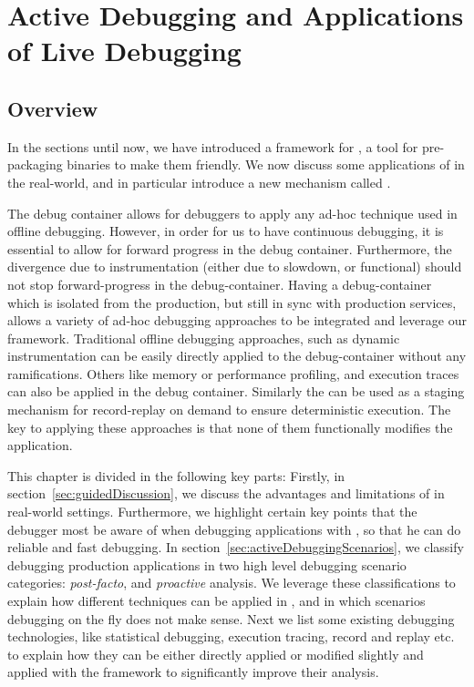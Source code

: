 \chapter{Active Debugging and Applications of Live Debugging}
\label{ch:activedebugging}

\section{Overview}
\label{sec:guided_overview}

In the sections until now, we have introduced a framework for \livedebugging, a tool for pre-packaging binaries to make them \livedebugging friendly. 
We now discuss some applications of \livedebugging in the real-world, and in particular introduce a new mechanism called \activedebugging.


The debug container allows for debuggers to apply any ad-hoc technique used in offline debugging.
However, in order for us to have continuous debugging, it is essential to allow for forward progress in the debug container. 
Furthermore, the divergence due to instrumentation (either due to slowdown, or functional) should not stop forward-progress in the debug-container.
Having a debug-container which is isolated from the production, but still in sync with production services, allows a variety of ad-hoc debugging approaches to be integrated and leverage our framework.
Traditional offline debugging approaches, such as dynamic instrumentation can be easily directly applied to the debug-container without any ramifications. 
Others like memory or performance profiling, and execution traces can also be applied in the debug container.
Similarly the \debugcontainer can be used as a staging mechanism for record-replay on demand to ensure deterministic execution.
The key to applying these approaches is that none of them functionally modifies the application.

This chapter is divided in the following key parts: Firstly, in section~\ref{sec:guidedDiscussion}, we discuss the advantages and limitations of \parikshan in real-world settings.
Furthermore, we highlight certain key points that the debugger most be aware of when debugging applications with \parikshan, so that he can do reliable and fast debugging. 
In section~\ref{sec:activeDebuggingScenarios}, we classify debugging production applications in two high level debugging scenario categories: \emph{post-facto}, and \emph{proactive} analysis.
We leverage these classifications to explain how different techniques can be applied in \parikshan, and in which scenarios debugging on the fly does not make sense.
Next we list some existing debugging technologies, like statistical debugging, execution tracing, record and replay etc. to explain how they can be either directly applied or modified slightly and applied with the \parikshan framework to significantly improve their analysis.

